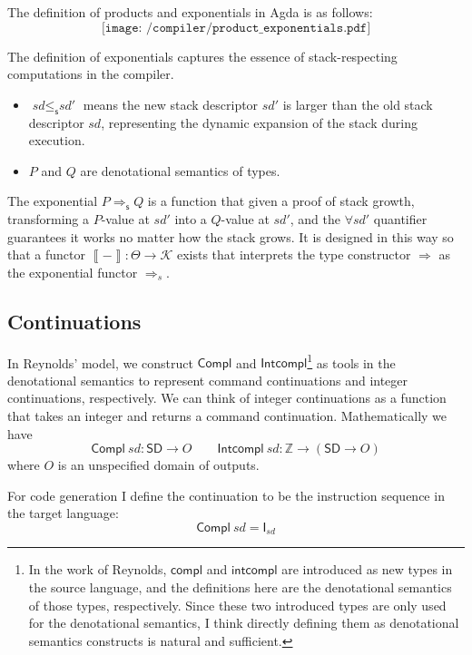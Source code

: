 \documentclass[12pt,a4paper]{report}
\theoremstyle{definition}
\newcommand{\bZ}{\ensuremath{\mathbb{Z}}}
\newcommand{\intp}[1]{\left\llbracket #1 \right\rrbracket}
\begin{document}
    The definition of products and exponentials in Agda is as follows:
    \[\texttt{[image: /compiler/product\_exponentials.pdf]}\]

    The definition of exponentials captures the essence of stack-respecting computations in the compiler. 
    \begin{itemize}
        \item $\textit{sd} \leq_\mathsf{s} \textit{sd′}$ means the new stack descriptor $\textit{sd′}$ is larger than the old stack descriptor $\textit{sd}$, representing the dynamic expansion of the stack during execution.

        \item $P$ and $Q$ are denotational semantics of types. 
    \end{itemize}
    The exponential $P \Rightarrow_\textsf{s} Q$ is a function that given a proof of stack growth, transforming a $P$-value at $\textit{sd′}$ into a $Q$-value at $\textit{sd′}$, and the $\forall{\textit{sd′}}$ quantifier guarantees it works no matter how the stack grows. It is designed in this way so that a functor $\intp{-} : \Theta \to \mathcal{K}$ exists that interprets the type constructor $\Rightarrow$ as the exponential functor $\Rightarrow_s$.

    \subsection{Continuations}
    In Reynolds' model, we construct $\mathsf{Compl}$ and $\mathsf{Intcompl}$\footnote{In the work of Reynolds, $\mathsf{compl}$ and $\mathsf{intcompl}$ are introduced as new types in the source language, and the definitions here are the denotational semantics of those types, respectively. Since these two introduced types are only used for the denotational semantics, I think directly defining them as denotational semantics constructs is natural and sufficient.} as tools in the denotational semantics to represent command continuations and integer continuations, respectively. We can think of integer continuations as a function that takes an integer and returns a command continuation. Mathematically we have
    \[\mathsf{Compl}\ \textit{sd} : \mathsf{SD} \to O \qquad \mathsf{Intcompl}\ \textit{sd} : \bZ \to (\mathsf{SD} \to O)\]
    where $O$ is an unspecified domain of outputs.

    For code generation I define the continuation to be the instruction sequence in the target language:
    \[\mathsf{Compl}\ \textit{sd} = \textsf{I}_{\textit{sd}}\]
\end{document}
